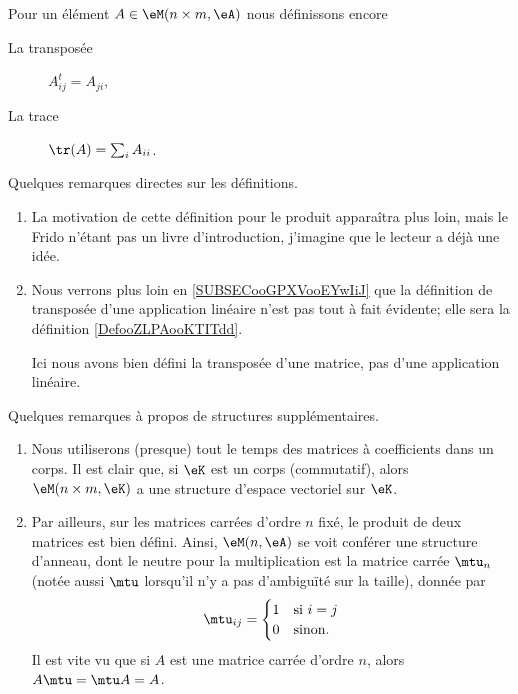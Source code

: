 \begin{definition}
    Pour un élément \( A\in \eM(n\times m, \eA)\) nous définissons encore
    \begin{description}
        \item[La transposée] \( A^t_{ij}=A_{ji}\),
        \item[La trace] \( \tr(A)=\sum_iA_{ii}\).
    \end{description}
\end{definition}


\begin{remark}
    Quelques remarques directes sur les définitions.
    \begin{enumerate}
        \item
            La motivation de cette définition pour le produit apparaîtra plus loin, mais le Frido n'étant pas un livre d'introduction, j'imagine que le lecteur a déjà une idée.
        \item
            Nous verrons plus loin en \ref{SUBSECooGPXVooEYwIiJ} que la définition de transposée d'une application linéaire n'est pas tout à fait évidente; elle sera la définition \ref{DefooZLPAooKTITdd}.

            Ici nous avons bien défini la transposée d'une matrice, pas d'une application linéaire.
    \end{enumerate}
\end{remark}

\begin{remark}
    Quelques remarques à propos de structures supplémentaires.
\begin{enumerate}
    \item Nous utiliserons (presque) tout le temps des matrices à coefficients dans un corps. Il est clair que, si \( \eK \) est un corps (commutatif), alors \( \eM(n\times m,\eK) \) a une structure d'espace vectoriel sur \( \eK \).
    \item Par ailleurs, sur les matrices carrées d'ordre \( n \) fixé, le produit de deux matrices est bien défini. Ainsi, \( \eM(n,\eA)\) se voit conférer une structure d'anneau, dont le neutre pour la multiplication est la matrice carrée \( \mtu_n\) (notée aussi \( \mtu\) lorsqu'il n'y a pas d'ambiguïté sur la taille), donnée par
\begin{equation}
    \mtu_{ij}=\begin{cases}
        1    &   \text{si } i=j\\
        0    &    \text{sinon.}
    \end{cases}
\end{equation}
Il est vite vu que si \( A\) est une matrice carrée d'ordre \( n \), alors \( A\mtu=\mtu A=A\).
\end{enumerate}
\end{remark}

